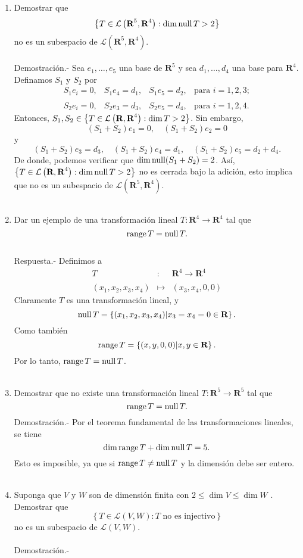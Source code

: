\begin{enumerate}[\bfseries 1.]
    \item Demostrar que
    $$\left\{ T\in \mathcal{L}\left(\textbf{R}^5,\textbf{R}^4\right):\dim \operatorname{null} T>2 \right\}$$
    no es un subespacio de $\mathcal{L}\left(\textbf{R}^5,\textbf{R}^4\right)$.\\\\
	Demostración.-\; Sea $e_1,\ldots,e_5$ una base de $\textbf{R}^5$ y sea $d_1,\ldots,d_4$ una base para $\textbf{R}^4$. Definamos $S_1$ y $S_2$ por
	$$
	\begin{array}{cccc}
	    S_1e_i=0,&S_1e_4=d_1,&S_1e_5=d_2,&\mbox{para } i=1,2,3;\\\\
	    S_2e_i=0,&S_2e_3=d_3,&S_2e_5=d_4,&\mbox{para } i=1,2,4.
	\end{array}
	$$
	Entonces, $S_1,S_2\in \left\{T\in \mathcal{L}\left(\textbf{R},\textbf{R}^4\right):\dim \null T > 2\right\}$. Sin embargo,
	$$(S_1+S_2)e_1=0,\quad (S_1+S_2)e_2=0$$
	y
	$$(S_1+S_2)e_3=d_3, \quad (S_1+S_2)e_4=d_1, \quad (S_1+S_2)e_5=d_2+d_4.$$
	De donde, podemos verificar que $\dim \operatorname{null}(S_1+S_2)=2$. Así, $\left\{T\in \mathcal{L}\left(\textbf{R},\textbf{R}^4\right):\dim \operatorname{null} T > 2\right\}$ no es cerrada bajo la adición, esto implica que no es un subespacio de $\mathcal{L}\left(\textbf{R}^5,\textbf{R}^4\right)$.\\\\

    \item Dar un ejemplo de una transformación lineal $T:\textbf{R}^4\to \textbf{R}^4$ tal que
    $$\operatorname{range} T=\operatorname{null} T.$$\\
	Respuesta.-\; Definimos a
	$$
	\begin{array}{rcl}
	    T &:& \textbf{R}^4\to \textbf{R}^4\\\\
	    (x_1,x_2,x_3,x_4) &\mapsto & (x_3,x_4,0,0)
	\end{array}
	$$
	Claramente $T$ es una transformación lineal, y 
	$$\operatorname{null} T = \left\{(x_1,x_2,x_3,x_4) | x_3=x_4=0 \in \textbf{R}\right\}.$$
	Como también 
	$$\operatorname{range} T = \left\{(x,y,0,0) | x,y \in \textbf{R}\right\}.$$
	Por lo tanto, $\operatorname{range} T = \operatorname{null} T$.\\\\

    \item Demostrar que no existe una transformación lineal $T:\textbf{R}^5\to \textbf{R}^5$ tal que
    $$\operatorname{range} T = \operatorname{null} T.$$
	Demostración.-\; Por el teorema fundamental de las transformaciones lineales, se tiene
	$$\dim \operatorname{range} T + \dim \operatorname{null} T = 5.$$
	Esto es imposible, ya que si $\operatorname{range} T \neq \operatorname{null} T$  y la dimensión debe ser entero.\\\\

    \item Suponga que $V$ y $W$ son de dimensión finita con $2\leq \dim V \leq \dim W$ . Demostrar que 
    $$\left\{T\in \mathcal{L}(V,W):T\mbox{ no es injectivo}\right\}$$ 
    no es un subespacio de $\mathcal{L}(V,W)$.\\\\
	Demostración.-\; 

\end{enumerate}
